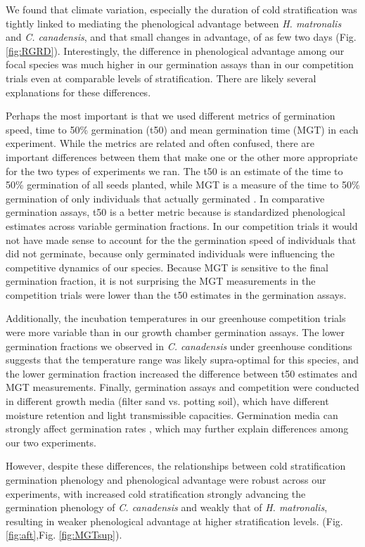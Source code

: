 \documentclass{article}[11pt]
\begin{document}
We found that climate variation, especially the duration of cold stratification was tightly linked to mediating the phenological advantage between \textit{H. matronalis} and \textit{C. canadensis}, and that small changes in advantage, of as few two days (Fig. \ref{fig:RGRD}). Interestingly, the difference in phenological advantage among our focal species was much higher in our germination assays than in our competition trials even at comparable levels of stratification. There are likely several explanations for these differences.

Perhaps the most important is that we used different metrics of germination speed, time to 50\% germination (t50) and mean germination time (MGT) in each experiment. While the metrics are related and often confused, there are important differences between them that make one or the other more appropriate for the two types of experiments we ran. The t50 is an estimate of the time to 50\% germination of all seeds planted, while MGT is a measure of the time to 50\% germination of only individuals that actually germinated \citep{Soltani:2015aa}. In comparative germination assays, t50 is a better metric because is standardized phenological estimates across variable germination fractions. In our competition trials it would not have made sense to account for the the germination speed of individuals that did not germinate, because only germinated individuals were influencing the competitive dynamics of our species. Because MGT is sensitive to the final germination fraction, it is not surprising the MGT measurements in the competition trials  were lower than the t50 estimates in the germination assays.

Additionally, the incubation temperatures in our greenhouse competition trials were more variable than in our growth chamber germination  assays. The lower germination fractions we observed in \textit{C. canadensis} under greenhouse conditions suggests that the temperature range was likely supra-optimal for this species, and the lower germination fraction increased the difference between t50 estimates and MGT measurements. Finally, germination assays and competition were conducted in different growth media (filter sand vs. potting soil), which have different moisture retention and light transmissible  capacities. Germination media can strongly affect germination rates \citep{}, which may further explain differences among our two experiments.

However, despite these differences, the relationships between cold stratification germination phenology and phenological advantage were robust across our experiments, with increased cold stratification strongly advancing the germination phenology of \textit{C. canadensis} and weakly that of \textit{H. matronalis}, resulting in weaker phenological advantage at higher stratification levels. (Fig. \ref{fig:aft},Fig. \ref{fig:MGTsup}).
\end{document}
